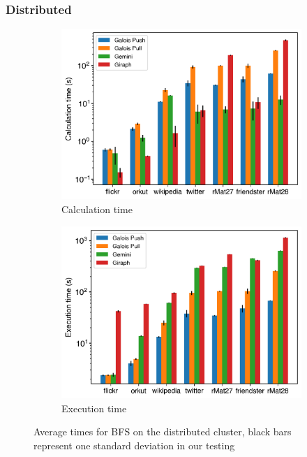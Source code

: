 \subsubsection{Distributed}
\begin{figure}
	\hfil
	\begin{subfigure}{0.32\textwidth}
		\includegraphics[width=\linewidth]{../../plots/distributedBFS_calcTime.png}
		\caption{Calculation time}
		\label{fig:distributedBFS_calc}
	\end{subfigure}
	\hfil
	\begin{subfigure}{0.32\textwidth}
		\includegraphics[width=\linewidth]{../../plots/distributedBFS_execTime.png}
		\caption{Execution time}
		\label{fig:distributedBFS_exec}
	\end{subfigure}
	\hfil
	\caption{Average times for BFS on the distributed cluster, black bars represent one standard deviation in our testing}
	\label{fig:distributedBFS}
\end{figure}
